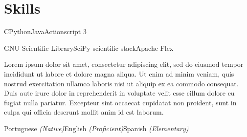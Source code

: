 
\section{Skills}

\begin{cvrows}[J]
	{C\dotsep Python\dotsep Java\dotsep Actionscript 3}
	
	{GNU Scientific Library\dotsep SciPy scientific stack\dotsep Apache Flex}
	
	{Lorem ipsum dolor sit amet, consectetur adipiscing elit, sed do eiusmod tempor incididunt ut labore et dolore magna aliqua. Ut enim ad minim veniam, quis nostrud exercitation ullamco laboris nisi ut aliquip ex ea commodo consequat. Duis aute irure dolor in reprehenderit in voluptate velit esse cillum dolore eu fugiat nulla pariatur. Excepteur sint occaecat cupidatat non proident, sunt in culpa qui officia deserunt mollit anim id est laborum.
	}
	
	{Portuguese \textit{(Native)}\dotsep English \textit{(Proficient)}\dotsep Spanish \textit{(Elementary)}}
	
\end{cvrows}


